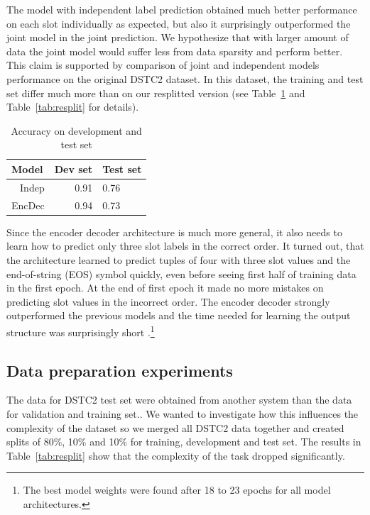 \documentclass{itatnew}
\def\VH#1{\textcolor{cyan}{VH: \textit{#1}}}
\begin{document}
The model with independent label prediction obtained much better performance on each slot individually as expected, but also it surprisingly outperformed the joint model in the joint prediction.
We hypothesize that with larger amount of data the joint model would suffer less from data sparsity and perform better.
This claim is supported by comparison of joint and independent models performance on the original DSTC2 dataset.
In this dataset, the training and test set differ much more than on our resplitted version (see Table~\ref{tab:dstc} and Table~\ref{tab:resplit} for details).

\begin{table}
\caption{Accuracy on development and test set}
\begin{center}
\begin{tabular}{r@{\quad}rll}
\hline
\multicolumn{1}{l}{\rule{0pt}{12pt}
                   Model}&\multicolumn{1}{l}{Dev set}&\multicolumn{2}{l}{Test set}\\[2pt]
\hline\rule{0pt}{12pt}
Indep  &   0.91 & 0.76 \\
EncDec &   0.94 & 0.73 \\
\hline
\end{tabular}
\end{center}
\label{tab:dstc}
\end{table}

Since the encoder decoder architecture is much more general, it also needs to learn how to predict only three slot labels in the correct order.
It turned out, that the architecture learned to predict tuples of four with three slot values and the end-of-string (EOS) symbol quickly, even before seeing first half of training data in the first epoch.
At the end of first epoch it made no more mistakes on predicting slot values in the incorrect order.
The encoder decoder strongly outperformed the previous models and the time needed for learning the output structure was surprisingly short .\footnote{The best model weights were found after 18 to 23 epochs for all model architectures.}

\subsection{Data preparation experiments}
\label{sec:split}
The data for DSTC2 test set were obtained from another system than the data for validation and training set.\cite{henderson2014second}.
We wanted to investigate how this influences the complexity of the dataset so we merged all DSTC2 data together and created splits of 80\%, 10\% and 10\% for training, development and test set.
The results in Table~\ref{tab:resplit} show that the complexity of the task dropped significantly.
\end{document}
